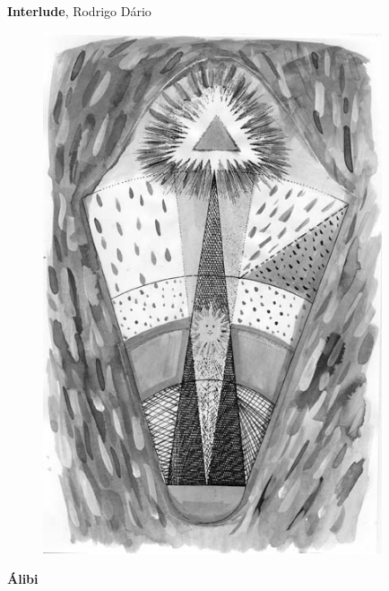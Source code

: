\pagebreak

\begin{absolutelynopagebreak}
\textbf{Interlude}, Rodrigo Dário

\thispagestyle{empty}

\begin{vplace}
\begin{figure}[H]
  \centering
  \vspace*{3cm}
  \includegraphics[width=100mm]{./imgs/caparc3.JPG}  

\end{figure}
\end{vplace}

\end{absolutelynopagebreak}

\pagebreak

\textbf{Álibi}

